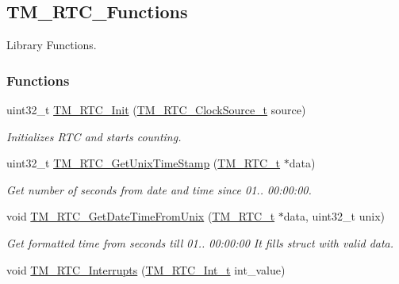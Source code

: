 \hypertarget{group___t_m___r_t_c___functions}{}\subsection{T\+M\+\_\+\+R\+T\+C\+\_\+\+Functions}
\label{group___t_m___r_t_c___functions}


Library Functions.  


\subsubsection*{Functions}
\begin{DoxyCompactItemize}
\item 
uint32\+\_\+t \hyperlink{group___t_m___r_t_c___functions_gac0fab900e7150c1d28b1f3238482d4e4}{T\+M\+\_\+\+R\+T\+C\+\_\+\+Init} (\hyperlink{group___t_m___r_t_c___typedefs_ga944a179f7f7042272040b3464ab89eb5}{T\+M\+\_\+\+R\+T\+C\+\_\+\+Clock\+Source\+\_\+t} source)
\begin{DoxyCompactList}\small\item\em Initializes R\+T\+C and starts counting. \end{DoxyCompactList}\item 
uint32\+\_\+t \hyperlink{group___t_m___r_t_c___functions_gab5f3515bc1cf70c83e9e178defa65a04}{T\+M\+\_\+\+R\+T\+C\+\_\+\+Get\+Unix\+Time\+Stamp} (\hyperlink{struct_t_m___r_t_c__t}{T\+M\+\_\+\+R\+T\+C\+\_\+t} $\ast$data)
\begin{DoxyCompactList}\small\item\em Get number of seconds from date and time since 01.. 00\+:00\+:00. \end{DoxyCompactList}\item 
void \hyperlink{group___t_m___r_t_c___functions_gac82051e0b33111d68efd1f91fc76e38a}{T\+M\+\_\+\+R\+T\+C\+\_\+\+Get\+Date\+Time\+From\+Unix} (\hyperlink{struct_t_m___r_t_c__t}{T\+M\+\_\+\+R\+T\+C\+\_\+t} $\ast$data, uint32\+\_\+t unix)
\begin{DoxyCompactList}\small\item\em Get formatted time from seconds till 01.. 00\+:00\+:00 It fills struct with valid data. \end{DoxyCompactList}\item 
void \hyperlink{group___t_m___r_t_c___functions_ga79476631cb5999d82b4bf453f136423e}{T\+M\+\_\+\+R\+T\+C\+\_\+\+Interrupts} (\hyperlink{group___t_m___r_t_c___typedefs_ga05e753ad5f63f28a20fe9f3b85e799f2}{T\+M\+\_\+\+R\+T\+C\+\_\+\+Int\+\_\+t} int\+\_\+value)

\end{DoxyCompactItemize}
